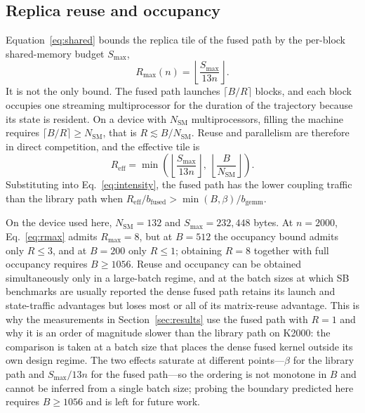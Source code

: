 \documentclass[11pt,a4paper]{article}
\begin{document}
\subsection{Replica reuse and occupancy}\label{sec:occupancy}
Equation~\eqref{eq:shared} bounds the replica tile of the fused path by the per-block shared-memory budget $S_{\max}$,
\begin{equation}
 R_{\max}(n)=\left\lfloor \frac{S_{\max}}{13n} \right\rfloor .
 \label{eq:rmax}
\end{equation}
It is not the only bound. The fused path launches $\lceil B/R\rceil$ blocks, and each block occupies one streaming multiprocessor for the duration of the trajectory because its state is resident. On a device with $N_{\mathrm{SM}}$ multiprocessors, filling the machine requires $\lceil B/R\rceil\ge N_{\mathrm{SM}}$, that is $R\lesssim B/N_{\mathrm{SM}}$. Reuse and parallelism are therefore in direct competition, and the effective tile is
\begin{equation}
 R_{\mathrm{eff}}=\min\!\left(\left\lfloor \frac{S_{\max}}{13n} \right\rfloor,\ \left\lfloor \frac{B}{N_{\mathrm{SM}}} \right\rfloor \right).
 \label{eq:reff}
\end{equation}
Substituting into Eq.~\eqref{eq:intensity}, the fused path has the lower coupling traffic than the library path when $R_{\mathrm{eff}}/b_{\mathrm{fused}} > \min(B,\beta)/b_{\mathrm{gemm}}$.

On the device used here, $N_{\mathrm{SM}}=132$ and $S_{\max}=232{,}448$ bytes. At $n=2000$, Eq.~\eqref{eq:rmax} admits $R_{\max}=8$, but at $B=512$ the occupancy bound admits only $R\le 3$, and at $B=200$ only $R\le 1$; obtaining $R=8$ together with full occupancy requires $B\ge 1056$. Reuse and occupancy can be obtained simultaneously only in a large-batch regime, and at the batch sizes at which SB benchmarks are usually reported the dense fused path retains its launch and state-traffic advantages but loses most or all of its matrix-reuse advantage. This is why the measurements in Section~\ref{sec:results} use the fused path with $R=1$ and why it is an order of magnitude slower than the library path on K2000: the comparison is taken at a batch size that places the dense fused kernel outside its own design regime. The two effects saturate at different points---$\beta$ for the library path and $S_{\max}/13n$ for the fused path---so the ordering is not monotone in $B$ and cannot be inferred from a single batch size; probing the boundary predicted here requires $B\ge 1056$ and is left for future work.
\end{document}
